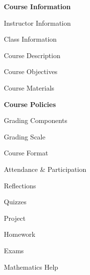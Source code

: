 \documentclass[11pt,letterpaper]{article}
\begin{document}
\mytitle




\begin{minipage}[t]{0.45\textwidth}
{\bfseries\color{stacred} Course Information} \dotfill \pageref{course_info} \par
\hspace{0.3cm} Instructor Information \dotfill \pageref{instr_info} \par
\hspace{0.3cm} Class Information \dotfill \pageref{class_info} \par
\hspace{0.3cm} Course Description \dotfill \pageref{course_desc} \par
\hspace{0.3cm} Course Objectives \dotfill \pageref{course_obj} \par
\hspace{0.3cm} Course Materials \dotfill \pageref{course_mat} \par
{\bfseries\color{stacred} Course Policies} \dotfill \pageref{course_polc} \par
\hspace{0.3cm} Grading Components \dotfill \pageref{grade_comp} \par
\hspace{0.3cm} Grading Scale \dotfill \pageref{grade_scale} \par
\hspace{0.3cm} Course Format \dotfill \pageref{course_form} \par
\hspace{0.3cm} Attendance \& Participation \dotfill \pageref{attend} \par
\hspace{0.3cm} Reflections \dotfill \pageref{reflections} \par
\hspace{0.3cm} Quizzes \dotfill \pageref{quiz} \par
\hspace{0.3cm} Project \dotfill \pageref{project} \par
\hspace{0.3cm} Homework \dotfill \pageref{hw} \par
\hspace{0.3cm} Exams \dotfill \pageref{exams} \par
\hspace{0.3cm} Mathematics Help \dotfill \pageref{help} \par

\end{minipage}
\end{document}
